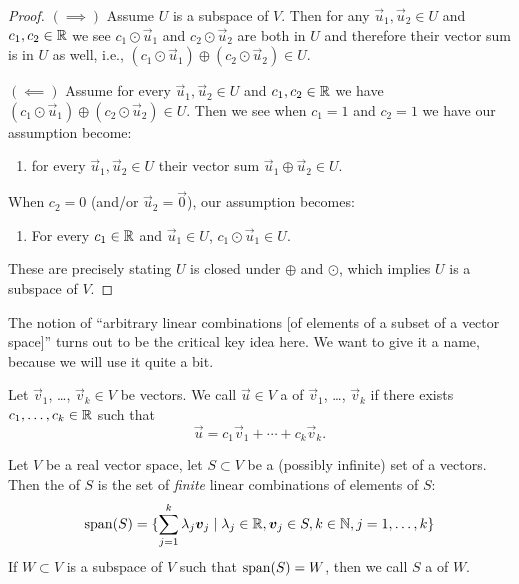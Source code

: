 \begin{proof}
$(\implies)$ Assume $U$ is a subspace of $V$.
Then for any $\vec{u}_{1},\vec{u}_{2}\in U$
and $c_{1},c_{2}\in\mathbb{R}$ we see $c_{1}\odot\vec{u}_{1}$ and $c_{2}\odot\vec{u}_{2}$
are both in $U$ and therefore their vector sum is in $U$ as well, i.e.,
$(c_{1}\odot\vec{u}_{1})\oplus(c_{2}\odot\vec{u}_{2})\in U$.

$(\impliedby)$ Assume for every $\vec{u}_{1},\vec{u}_{2}\in U$
and $c_{1},c_{2}\in\mathbb{R}$ we have $(c_{1}\odot \vec{u}_{1})\oplus(c_{2}\odot \vec{u}_{2})\in U$.
Then we see when $c_{1}=1$ and $c_{2}=1$ we have our assumption become:
\begin{enumerate}[label=(\alph*)]
\item for every $\vec{u}_{1},\vec{u}_{2}\in U$ their vector sum
  $\vec{u}_{1}\oplus\vec{u}_{2}\in U$.
\end{enumerate}
When $c_{2}=0$ (and/or $\vec{u}_{2}=\vec{0}$), our assumption becomes:
\begin{enumerate}[resume*]
\item For every $c_{1}\in\mathbb{R}$ and $\vec{u}_{1}\in U$,
  $c_{1}\odot\vec{u}_{1}\in U$.
\end{enumerate}
These are precisely stating $U$ is closed under $\oplus$ and $\odot$,
which implies $U$ is a subspace of $V$.
\end{proof}

\begin{remark}
The notion of ``arbitrary linear combinations [of elements of a subset
  of a vector space]'' turns out to be the critical key idea here. We
want to give it a name, because we will use it quite a bit.
\end{remark}

\begin{definition}
Let $\vec{v}_{1}$, \dots, $\vec{v}_{k}\in V$ be vectors. We call
$\vec{u}\in V$ a  of $\vec{v}_{1}$, \dots,
$\vec{v}_{k}$ if there exists $c_{1},\dots,c_{k}\in\mathbb{R}$ such that
\begin{equation}
\vec{u} = c_{1}\vec{v}_{1} + \cdots + c_{k}\vec{v}_{k}.
\end{equation}
\end{definition}

\begin{definition}
Let $V$ be a real vector space, let $S\subset V$ be a (possibly
infinite) set of a vectors. Then the  of $S$ is the set of
\emph{finite} linear combinations of elements of $S$:
\begin{equation}
\operatorname{span}(S) =
\{\sum^{k}_{j=1}\lambda_{j}\boldsymbol{v}_{j}\mid\lambda_{j}\in\mathbb{R},\boldsymbol{v}_{j}\in S,k\in\mathbb{N},j=1,\dots,k\}
\end{equation}
If $W\subset V$ is a subspace of $V$ such that $\operatorname{span}(S) = W$, then we
call $S$ a  of $W$.
\end{definition}

